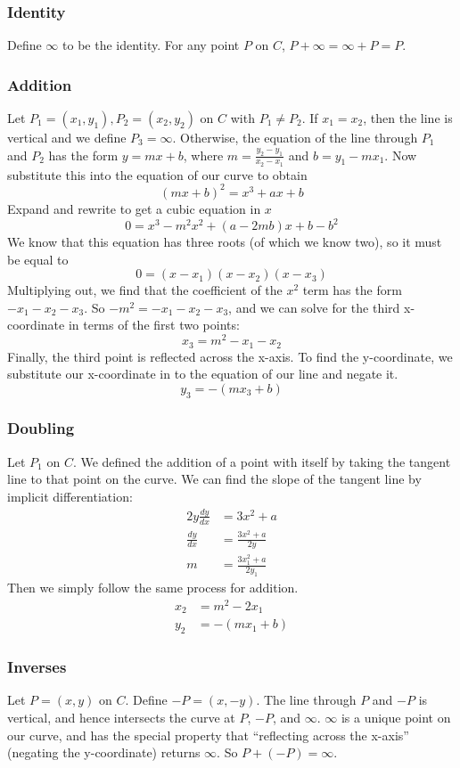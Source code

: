 \documentclass{article}
\begin{document}
\subsubsection{Identity}
Define $\infty$ to be the identity. For any point $P$ on $C$, $P+\infty = \infty + P = P$.

\subsubsection{Addition}
Let $P_1 = (x_1,y_1), P_2 = (x_2,y_2)$ on $C$ with $P_1 \neq P_2$.
If $x_1 = x_2$, then the line is vertical and we define $P_3 = \infty$.
Otherwise, the equation of the line through $P_1$ and $P_2$ has the form $y = mx + b$, where $m = \frac{y_2-y_1}{x_2-x_1}$ and $b = y_1 - mx_1$.
Now substitute this into the equation of our curve to obtain
$$(mx+b)^2 = x^3 + ax + b$$
Expand and rewrite to get a cubic equation in $x$
$$0 = x^3 - m^2x^2 + (a-2mb)x + b - b^2$$
We know that this equation has three roots (of which we know two), so it must be equal to
$$0 = (x-x_1)(x-x_2)(x-x_3)$$
Multiplying out, we find that the coefficient of the $x^2$ term has the form $-x_1 - x_2 - x_3$. So $-m^2 = -x_1 - x_2 - x_3$, and we can solve for the third x-coordinate in terms of the first two points:
$$x_3 = m^2 - x_1 - x_2$$
Finally, the third point is reflected across the x-axis.
To find the y-coordinate, we substitute our x-coordinate in to the equation of our line and negate it.
$$y_3 = -(mx_3 + b)$$

\subsubsection{Doubling}
Let $P_1$ on $C$.
We defined the addition of a point with itself by taking the tangent line to that point on the curve.
We can find the slope of the tangent line by implicit differentiation:
\begin{align*}
2y \frac{dy}{dx} &= 3x^2 + a \\
\frac{dy}{dx} &= \frac{3x^2+a}{2y} \\
m &= \frac{3x_1^2+a}{2y_1} 
\end{align*}
Then we simply follow the same process for addition.
\begin{align*}
x_2 &= m^2 - 2x_1 \\
y_2 &= -(mx_1 + b)
\end{align*}

\subsubsection{Inverses}
Let $P=(x,y)$ on $C$. Define $-P = (x,-y)$.
The line through $P$ and $-P$ is vertical, and hence intersects the curve at $P$, $-P$, and $\infty$.
$\infty$ is a unique point on our curve, and has the special property that ``reflecting across the x-axis'' (negating the y-coordinate) returns $\infty$.
So $P + (-P) = \infty$.
\end{document}
